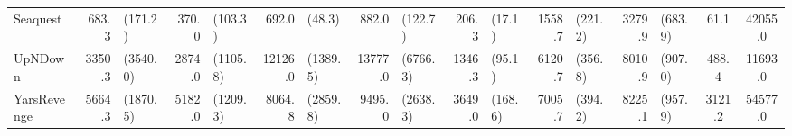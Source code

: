 \begin{landscape}
\begin{changemargin}{0cm}{0cm}
\begin{center}
\begin{table}[!htbp]
\begin{tabular}{lrlrlrlrlrlrlrlcc}
Seaquest       &    683.3 &    (171.2) &    370.0 &   (103.3) &      692.0 &       (48.3) &    882.0 &    (122.7) &    206.3 &   (17.1) &   1558.7 &    (221.2) &    3279.9 &    (683.9) &     61.1 &  42055.0 \\
UpNDown        &   3350.3 &   (3540.0) &   2874.0 &  (1105.8) &    12126.0 &     (1389.5) &  13777.0 &   (6766.3) &   1346.3 &   (95.1) &   6120.7 &    (356.8) &    8010.9 &    (907.0) &    488.4 &  11693.0 \\
YarsRevenge    &   5664.3 &   (1870.5) &   5182.0 &  (1209.3) &     8064.8 &     (2859.8) &   9495.0 &   (2638.3) &   3649.0 &  (168.6) &   7005.7 &    (394.2) &    8225.1 &    (957.9) &   3121.2 &  54577.0 \\

\end{tabular}
\end{table}
\end{center}
\end{changemargin}
\end{landscape}
